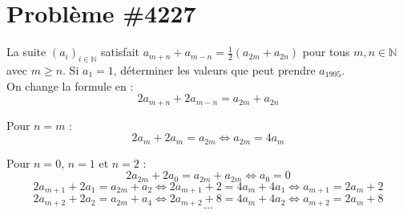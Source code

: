 \documentclass[12pt]{article}
\begin{document}
\section*{Problème \#4227}

La suite $(a_i)_{i \in \mathbb{N}}$ satisfait $a_{m+n} + a_{m-n} = \frac{1}{2}(a_{2m}+a_{2n})$ pour tous $m, n \in \mathbb{N}$ avec $m \geq n$. 
Si $a_1 = 1$, déterminer les valeurs que peut prendre $a_{1995}$. \\

On change la formule en : 
$$2a_{m+n} + 2a_{m-n} = a_{2m} + a_ {2n}$$

Pour $n=m$ : $$2a_{m} + 2a_{m} = a_{2m}  \iff \boxed{a_{2m} = 4a_{m}}$$

Pour $n=0$, $n=1$ et $n=2$ :
$$2a_{2m} + 2a_{0} = a_{2m} + a_{2m} \iff \boxed{a_0 = 0}$$
$$2a_{m+1} + 2a_{1} = a_{2m} + a_{2} \iff 2a_{m+1} + 2 = 4a_{m} + 4a_1 \iff \boxed{a_{m+1} = 2a_{m} + 2}$$
$$2a_{m+2} + 2a_{2} = a_{2m} + a_{4} \iff 2a_{m+2} + 8 = 4a_{m} + 4a_2 \iff \boxed{a_{m+2} = 2a_{m} + 8}$$
$$\cdots$$
\end{document}

